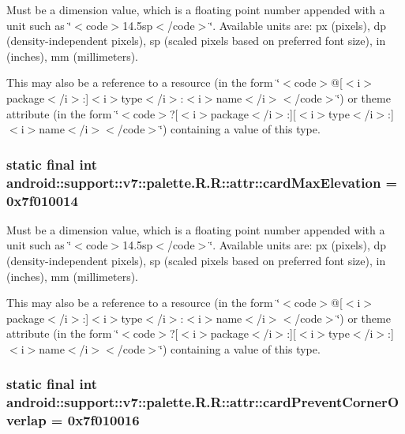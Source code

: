 Must be a dimension value, which is a floating point number appended with a unit such as \char`\"{}$<$code$>$14.5sp$<$/code$>$\char`\"{}. Available units are: px (pixels), dp (density-independent pixels), sp (scaled pixels based on preferred font size), in (inches), mm (millimeters). 

This may also be a reference to a resource (in the form \char`\"{}$<$code$>$@\mbox{[}$<$i$>$package$<$/i$>$:\mbox{]}$<$i$>$type$<$/i$>$:$<$i$>$name$<$/i$>$$<$/code$>$\char`\"{}) or theme attribute (in the form \char`\"{}$<$code$>$?\mbox{[}$<$i$>$package$<$/i$>$:\mbox{]}\mbox{[}$<$i$>$type$<$/i$>$:\mbox{]}$<$i$>$name$<$/i$>$$<$/code$>$\char`\"{}) containing a value of this type. \hypertarget{classandroid_1_1support_1_1v7_1_1palette_1_1_r_1_1attr_5d575707f5b14e132329bdc526e55532}{
\subsubsection[{cardMaxElevation}]{\setlength{\rightskip}{0pt plus 5cm}static final int android::support::v7::palette.R.R::attr::cardMaxElevation = 0x7f010014}}
\label{classandroid_1_1support_1_1v7_1_1palette_1_1_r_1_1attr_5d575707f5b14e132329bdc526e55532}


Must be a dimension value, which is a floating point number appended with a unit such as \char`\"{}$<$code$>$14.5sp$<$/code$>$\char`\"{}. Available units are: px (pixels), dp (density-independent pixels), sp (scaled pixels based on preferred font size), in (inches), mm (millimeters). 

This may also be a reference to a resource (in the form \char`\"{}$<$code$>$@\mbox{[}$<$i$>$package$<$/i$>$:\mbox{]}$<$i$>$type$<$/i$>$:$<$i$>$name$<$/i$>$$<$/code$>$\char`\"{}) or theme attribute (in the form \char`\"{}$<$code$>$?\mbox{[}$<$i$>$package$<$/i$>$:\mbox{]}\mbox{[}$<$i$>$type$<$/i$>$:\mbox{]}$<$i$>$name$<$/i$>$$<$/code$>$\char`\"{}) containing a value of this type. \hypertarget{classandroid_1_1support_1_1v7_1_1palette_1_1_r_1_1attr_76c333f3e7b3fedb2e7c3265b76f1bee}{
\subsubsection[{cardPreventCornerOverlap}]{\setlength{\rightskip}{0pt plus 5cm}static final int android::support::v7::palette.R.R::attr::cardPreventCornerOverlap = 0x7f010016}}
\label{classandroid_1_1support_1_1v7_1_1palette_1_1_r_1_1attr_76c333f3e7b3fedb2e7c3265b76f1bee}


